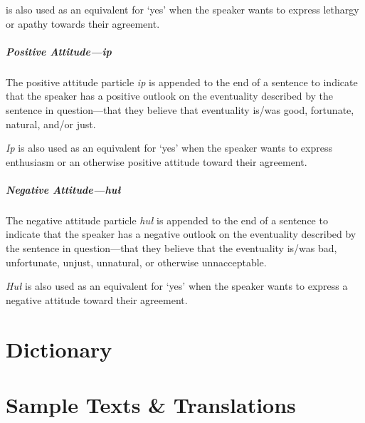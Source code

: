 \documentclass[a4paper,11pt,oneside,openany]{memoir}
\begin{document}
is also used as an equivalent for `yes' when the speaker wants to express lethargy or apathy towards their agreement.

\subsubsection{Positive Attitude---\textit{ip}}

The positive attitude particle \textit{ip} is appended to the end of a sentence to indicate that the speaker has a positive outlook on the eventuality described by the sentence in question---that they believe that eventuality is/was good, fortunate, natural, and/or just.


\textit{Ip} is also used as an equivalent for `yes' when the speaker wants to express enthusiasm or an otherwise positive attitude toward their agreement.

\subsubsection{Negative Attitude---\textit{hu\l}}

The negative attitude particle \textit{hu\l} is appended to the end of a sentence to indicate that the speaker has a negative outlook on the eventuality described by the sentence in question---that they believe that the eventuality is/was bad, unfortunate, unjust, unnatural, or otherwise unnacceptable.


\textit{Hu\l} is also used as an equivalent for `yes' when the speaker wants to express a negative attitude toward their agreement.


\part{Dictionary}

\pagestyle{headings}
\nouppercaseheads



\part{Sample Texts \& Translations}
\end{document}
